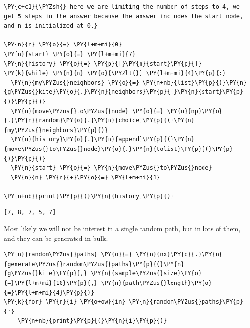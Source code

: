     \begin{tcolorbox}[breakable, size=fbox, boxrule=1pt, pad at break*=1mm,colback=cellbackground, colframe=cellborder]
\begin{Verbatim}[commandchars=\\\{\}]
\PY{c+c1}{\PYZsh{} here we are limiting the number of steps to 4, we get 5 steps in the answer because the answer includes the start node, and n is initialized at 0.}

\PY{n}{n} \PY{o}{=} \PY{l+m+mi}{0}
\PY{n}{start} \PY{o}{=} \PY{l+m+mi}{7}
\PY{n}{history} \PY{o}{=} \PY{p}{[}\PY{n}{start}\PY{p}{]}
\PY{k}{while} \PY{n}{n} \PY{o}{\PYZlt{}} \PY{l+m+mi}{4}\PY{p}{:}
  \PY{n}{my\PYZus{}neighbors} \PY{o}{=} \PY{n+nb}{list}\PY{p}{(}\PY{n}{g\PYZus{}kite}\PY{o}{.}\PY{n}{neighbors}\PY{p}{(}\PY{n}{start}\PY{p}{)}\PY{p}{)}
  \PY{n}{move\PYZus{}to\PYZus{}node} \PY{o}{=} \PY{n}{np}\PY{o}{.}\PY{n}{random}\PY{o}{.}\PY{n}{choice}\PY{p}{(}\PY{n}{my\PYZus{}neighbors}\PY{p}{)}
  \PY{n}{history}\PY{o}{.}\PY{n}{append}\PY{p}{(}\PY{n}{move\PYZus{}to\PYZus{}node}\PY{o}{.}\PY{n}{tolist}\PY{p}{(}\PY{p}{)}\PY{p}{)}
  \PY{n}{start} \PY{o}{=} \PY{n}{move\PYZus{}to\PYZus{}node}
  \PY{n}{n} \PY{o}{+}\PY{o}{=} \PY{l+m+mi}{1}

\PY{n+nb}{print}\PY{p}{(}\PY{n}{history}\PY{p}{)}
\end{Verbatim}
\end{tcolorbox}

    \begin{Verbatim}[commandchars=\\\{\}]
[7, 8, 7, 5, 7]
    \end{Verbatim}

    Most likely we will not be interest in a single random path, but in lots
of them, and they can be generated in bulk.

    \begin{tcolorbox}[breakable, size=fbox, boxrule=1pt, pad at break*=1mm,colback=cellbackground, colframe=cellborder]
\begin{Verbatim}[commandchars=\\\{\}]
\PY{n}{random\PYZus{}paths} \PY{o}{=} \PY{n}{nx}\PY{o}{.}\PY{n}{generate\PYZus{}random\PYZus{}paths}\PY{p}{(}\PY{n}{g\PYZus{}kite}\PY{p}{,} \PY{n}{sample\PYZus{}size}\PY{o}{=}\PY{l+m+mi}{10}\PY{p}{,} \PY{n}{path\PYZus{}length}\PY{o}{=}\PY{l+m+mi}{4}\PY{p}{)}
\PY{k}{for} \PY{n}{i} \PY{o+ow}{in} \PY{n}{random\PYZus{}paths}\PY{p}{:}
    \PY{n+nb}{print}\PY{p}{(}\PY{n}{i}\PY{p}{)}
\end{Verbatim}
\end{tcolorbox}

